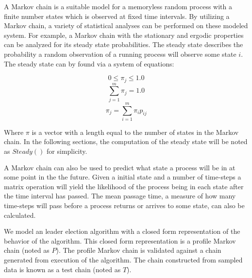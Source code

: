 A Markov chain is a suitable model for a memoryless random process with a finite number states which is observed at fixed time intervals. 
By utilizing a Markov chain, a variety of statistical analyses can be performed on these modeled system.
For example, a Markov chain with the stationary and ergodic properties can be analyzed for its steady state probabilities.
The steady state describes the probability a random observation of a running process will observe some state $i$.
The steady state can by found via a system of equations: \cite{MARKOV3}

\[  0\leq\pi_j\leq1.0 \]
\[	\sum_{j = 1}^{m}\pi_j = 1.0 \]
\[	\pi_j = \sum_{i=1}^{m} \pi_i p_{ij} \]

Where $\pi$ is a vector with a length equal to the number of states in the Markov chain.
In the following sections, the computation of the steady state will be noted as $Steady()$ for simplicity.

A Markov chain can also be used to predict what state a process will be in at some point in the the future.
Given a initial state and a number of time-steps a matrix operation will yield the likelihood of the process being in each state after the time interval has passed.
The mean passage time, a measure of how many time-steps will pass before a process returns or arrives to some state, can also be calculated.

We model an leader election algorithm with a closed form representation of the behavior of the algorithm.
This closed form representation is a profile Markov chain (noted as $P$).
The profile Markov chain is validated against a chain generated from execution of the algorithm.
The chain constructed from sampled data is known as a test chain (noted as $T$).
